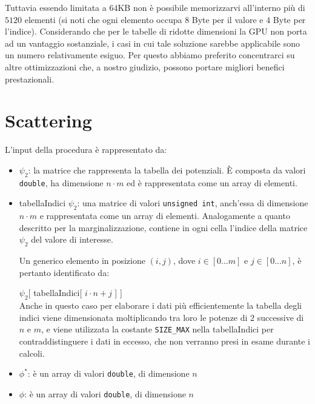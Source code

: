 \documentclass[a4paper]{article}   %
\begin{document}
Tuttavia essendo limitata a $64$KB non è possibile memorizzarvi all’interno più di $5120$ elementi (si noti che ogni elemento occupa $8$ Byte per il valore e $4$ Byte per l’indice). Considerando che per le tabelle di ridotte dimensioni la GPU non porta ad un vantaggio sostanziale, i casi in cui tale soluzione sarebbe applicabile sono un numero relativamente esiguo. Per questo abbiamo preferito concentrarci su altre ottimizzazioni che, a nostro giudizio, possono portare migliori benefici prestazionali.
\section{Scattering}
L'input della procedura è rappresentato da:
\begin{itemize}
\item $\psi_2$: la matrice che rappresenta la tabella dei potenziali. \`E composta da valori {\tt double}, ha dimensione $n \cdot m$ ed è rappresentata come un array di elementi.
\item tabellaIndici $\psi_2$: una matrice di valori {\tt unsigned int}, anch’essa di dimensione $n \cdot m$ e rappresentata come un array di elementi. Analogamente a quanto descritto per la marginalizzazione, contiene in ogni cella l’indice della matrice $\psi_2$ del valore di interesse.

Un generico elemento in posizione $(i, j)$, dove $i \in [0...m]$ e $j \in [0...n]$,
è pertanto identificato da: 

$\psi_2$[ tabellaIndici[ $i \cdot n + j$ ] ]\\
Anche in questo caso per elaborare i dati più efficientemente la tabella degli indici viene dimensionata moltiplicando tra loro le potenze di $2$ successive di $n$ e $m$, e viene utilizzata la costante {\tt SIZE\_MAX} nella tabellaIndici per contraddistinguere i dati in eccesso, che non verranno presi in esame durante i calcoli.

\item $\phi^{*}$: è un array di valori {\tt double}, di dimensione $n$
\item $\phi$: è un array di valori {\tt double}, di dimensione $n$
\end{itemize}

\end{document}
